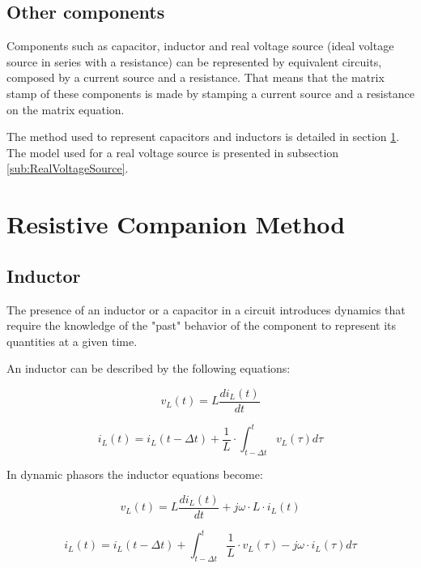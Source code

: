 \subsection{Other components}
Components such as capacitor, inductor and real voltage source (ideal voltage source in series with a resistance) can be represented by equivalent circuits, composed by a current source and a resistance. That means that the matrix stamp of these components is made by stamping a current source and a resistance on the matrix equation.

The method used to represent capacitors and inductors is detailed in section \ref{ResistiveCompanion}. The model used for a real voltage source is presented in subsection \ref{sub:RealVoltageSource}.

 
\section{Resistive Companion Method} \label{ResistiveCompanion}

\subsection{Inductor} \label{ResistiveCompanionInductor}
The presence of an inductor or a capacitor in a circuit introduces dynamics that require the knowledge of the "past" behavior of the component to represent its quantities at a given time.

An inductor can be described by the following equations: 

\begin{equation}
        v_L(t) = L \frac{di_L(t)}{dt}
\end{equation}

\begin{equation}
        i_L(t) = i_L(t- \Delta t) + \frac{1}{L} \cdot \int_{t- \Delta t}^{t} v_L(\tau) d \tau 
\end{equation}

In dynamic phasors the inductor equations become:

\begin{equation}
        v_L(t) = L \frac{di_L(t)}{dt} + j \omega \cdot L \cdot  i_L(t)
\end{equation}

\begin{equation}
        i_L(t) = i_L(t- \Delta t) +  \int_{t- \Delta t}^{t} \frac{1}{L} \cdot v_L(\tau) -j \omega \cdot i_L(\tau)d \tau 
\end{equation}


